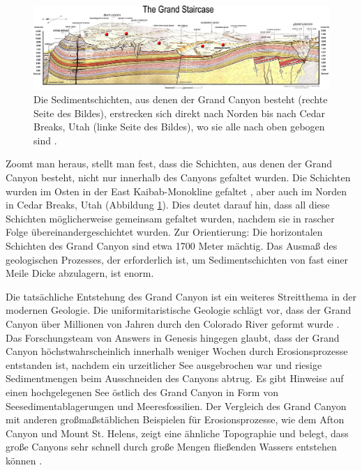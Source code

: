 \documentclass[10pt,twocolumn,letterpaper]{article}
\begin{document}
\begin{figure}
\begin{center}
\includegraphics[width=1\textwidth]{Grand_Staircase-big.jpg}
\end{center}
   \caption{Die Sedimentschichten, aus denen der Grand Canyon besteht (rechte Seite des Bildes), erstrecken sich direkt nach Norden bis nach Cedar Breaks, Utah (linke Seite des Bildes), wo sie alle nach oben gebogen sind \cite{50}.}
\label{fig:4}
\end{figure}

Zoomt man heraus, stellt man fest, dass die Schichten, aus denen der Grand Canyon besteht, nicht nur innerhalb des Canyons gefaltet wurden. Die Schichten wurden im Osten in der East Kaibab-Monokline gefaltet \cite{46}, aber auch im Norden in Cedar Breaks, Utah (Abbildung \ref{fig:4}). Dies deutet darauf hin, dass all diese Schichten möglicherweise gemeinsam gefaltet wurden, nachdem sie in rascher Folge übereinandergeschichtet wurden. Zur Orientierung: Die horizontalen Schichten des Grand Canyon sind etwa 1700 Meter mächtig. Das Ausmaß des geologischen Prozesses, der erforderlich ist, um Sedimentschichten von fast einer Meile Dicke abzulagern, ist enorm.

Die tatsächliche Entstehung des Grand Canyon ist ein weiteres Streitthema in der modernen Geologie. Die uniformitaristische Geologie schlägt vor, dass der Grand Canyon über Millionen von Jahren durch den Colorado River geformt wurde \cite{47}. Das Forschungsteam von Answers in Genesis hingegen glaubt, dass der Grand Canyon höchstwahrscheinlich innerhalb weniger Wochen durch Erosionsprozesse entstanden ist, nachdem ein urzeitlicher See ausgebrochen war und riesige Sedimentmengen beim Ausschneiden des Canyons abtrug. Es gibt Hinweise auf einen hochgelegenen See östlich des Grand Canyon in Form von Seesedimentablagerungen und Meeresfossilien. Der Vergleich des Grand Canyon mit anderen großmaßstäblichen Beispielen für Erosionsprozesse, wie dem Afton Canyon und Mount St. Helens, zeigt eine ähnliche Topographie und belegt, dass große Canyons sehr schnell durch große Mengen fließenden Wassers entstehen können \cite{48}.
\end{document}
